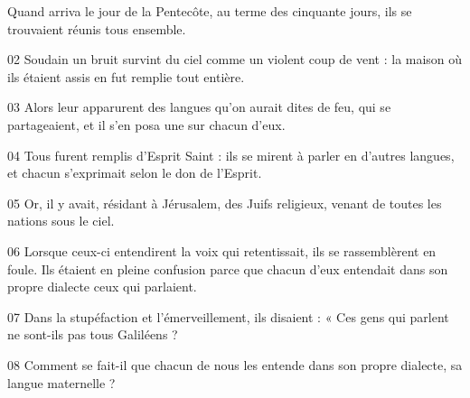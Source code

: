 Quand arriva le jour de la Pentecôte, au terme des cinquante jours, ils se trouvaient réunis tous ensemble.

02 Soudain un bruit survint du ciel comme un violent coup de vent : la maison où ils étaient assis en fut remplie tout entière.

03 Alors leur apparurent des langues qu’on aurait dites de feu, qui se partageaient, et il s’en posa une sur chacun d’eux.

04 Tous furent remplis d’Esprit Saint : ils se mirent à parler en d’autres langues, et chacun s’exprimait selon le don de l’Esprit.

05 Or, il y avait, résidant à Jérusalem, des Juifs religieux, venant de toutes les nations sous le ciel.

06 Lorsque ceux-ci entendirent la voix qui retentissait, ils se rassemblèrent en foule. Ils étaient en pleine confusion parce que chacun d’eux entendait dans son propre dialecte ceux qui parlaient.

07 Dans la stupéfaction et l’émerveillement, ils disaient : « Ces gens qui parlent ne sont-ils pas tous Galiléens ?

08 Comment se fait-il que chacun de nous les entende dans son propre dialecte, sa langue maternelle ?